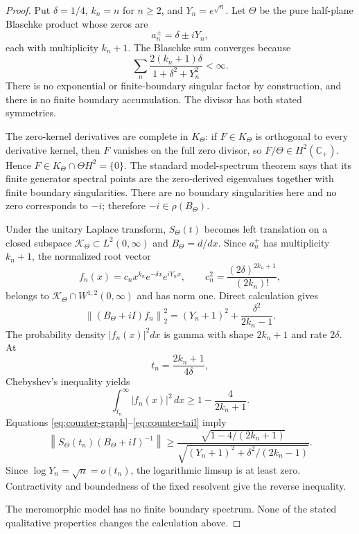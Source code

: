 \documentclass[11pt]{amsart}
\theoremstyle{definition}
\theoremstyle{remark}
\newcommand{\C}{\mathbb C}
\newcommand{\norm}[1]{\left\lVert #1\right\rVert}
\newcommand{\abs}[1]{\left\lvert #1\right\rvert}
\begin{document}
\begin{proof}
Put $\delta=1/4$, $k_n=n$ for $n\geq2$, and $Y_n=e^{\sqrt n}$.  Let
$\Theta$ be the pure
half-plane Blaschke product whose zeros are
\[
 a_n^\pm=\delta\pm iY_n,
\]
each with multiplicity $k_n+1$.  The Blaschke sum converges because
\[
 \sum_n\frac{2(k_n+1)\delta}{1+\delta^2+Y_n^2}<\infty.
\]
There is no exponential or finite-boundary singular factor by construction,
and there is no finite boundary accumulation.  The divisor has both stated
symmetries.

The zero-kernel derivatives are complete in $K_\Theta$: if
$F\in K_\Theta$ is orthogonal to every derivative kernel, then $F$ vanishes
on the full zero divisor, so $F/\Theta\in H^2(\C_+)$.  Hence
$F\in K_\Theta\cap\Theta H^2=\{0\}$.  The standard model-spectrum theorem
\cite{Nikolski2002} says that its finite generator spectral points are the
zero-derived eigenvalues together with finite boundary singularities.
There are no boundary singularities here and no zero corresponds to $-i$;
therefore $-i\in\rho(B_\Theta)$.

Under the unitary Laplace transform, $S_\Theta(t)$ becomes left translation
on a closed subspace $\mathscr K_\Theta\subset L^2(0,\infty)$ and
$B_\Theta=d/dx$.  Since $a_n^+$ has multiplicity $k_n+1$, the normalized
root vector
\[
 f_n(x)=c_nx^{k_n}e^{-\delta x}e^{iY_nx},
 \qquad
 c_n^2=\frac{(2\delta)^{2k_n+1}}{(2k_n)!},
\]
belongs to $\mathscr K_\Theta\cap W^{1,2}(0,\infty)$ and has norm one.
Direct calculation gives
\begin{equation}\label{eq:counter-graph}
 \norm{(B_\Theta+iI)f_n}_2^2
 =(Y_n+1)^2+\frac{\delta^2}{2k_n-1}.
\end{equation}
The probability density $\abs{f_n(x)}^2dx$ is gamma with shape $2k_n+1$
and rate $2\delta$.  At
\[
 t_n=\frac{2k_n+1}{4\delta},
\]
Chebyshev's inequality yields
\begin{equation}\label{eq:counter-tail}
 \int_{t_n}^\infty\abs{f_n(x)}^2\,dx
 \geq1-\frac4{2k_n+1}.
\end{equation}
Equations \eqref{eq:counter-graph}--\eqref{eq:counter-tail} imply
\[
 \norm{S_\Theta(t_n)(B_\Theta+iI)^{-1}}
 \geq
 \frac{\sqrt{1-4/(2k_n+1)}}
 {\sqrt{(Y_n+1)^2+\delta^2/(2k_n-1)}}.
\]
Since $\log Y_n=\sqrt n=o(t_n)$, the logarithmic limsup is at least zero.
Contractivity and boundedness of the fixed resolvent give the reverse
inequality.

The meromorphic model has no finite boundary spectrum.  None of the stated
qualitative properties changes the calculation above.
\end{proof}
\end{document}
